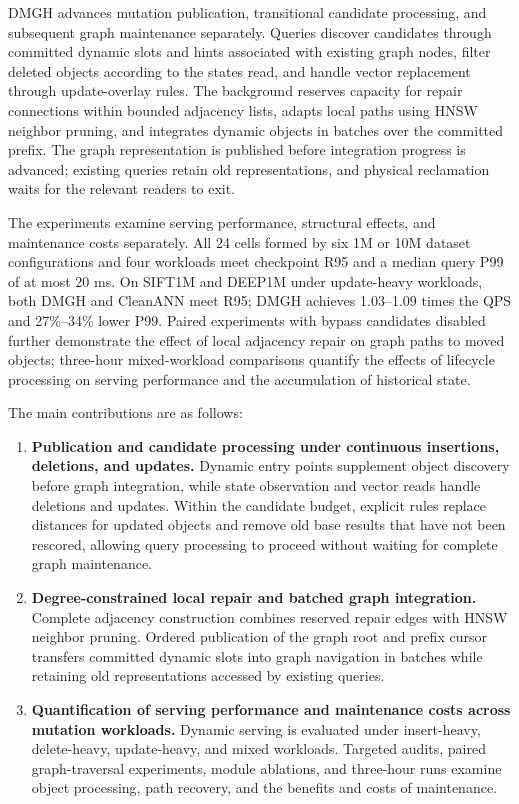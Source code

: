 \documentclass[sigconf,pbalance]{acmart}
\begin{document}
DMGH advances mutation publication, transitional candidate processing, and subsequent graph maintenance separately. Queries discover candidates through committed dynamic slots and hints associated with existing graph nodes, filter deleted objects according to the states read, and handle vector replacement through update-overlay rules. The background reserves capacity for repair connections within bounded adjacency lists, adapts local paths using HNSW neighbor pruning, and integrates dynamic objects in batches over the committed prefix. The graph representation is published before integration progress is advanced; existing queries retain old representations, and physical reclamation waits for the relevant readers to exit.

The experiments examine serving performance, structural effects, and maintenance costs separately. All 24 cells formed by six 1M or 10M dataset configurations and four workloads meet checkpoint R95 and a median query P99 of at most 20 ms. On SIFT1M and DEEP1M under update-heavy workloads, both DMGH and CleanANN meet R95; DMGH achieves 1.03--1.09 times the QPS and 27\%--34\% lower P99. Paired experiments with bypass candidates disabled further demonstrate the effect of local adjacency repair on graph paths to moved objects; three-hour mixed-workload comparisons quantify the effects of lifecycle processing on serving performance and the accumulation of historical state.

The main contributions are as follows:
\begin{enumerate}
\item \textbf{Publication and candidate processing under continuous insertions, deletions, and updates.} Dynamic entry points supplement object discovery before graph integration, while state observation and vector reads handle deletions and updates. Within the candidate budget, explicit rules replace distances for updated objects and remove old base results that have not been rescored, allowing query processing to proceed without waiting for complete graph maintenance.
\item \textbf{Degree-constrained local repair and batched graph integration.} Complete adjacency construction combines reserved repair edges with HNSW neighbor pruning. Ordered publication of the graph root and prefix cursor transfers committed dynamic slots into graph navigation in batches while retaining old representations accessed by existing queries.
\item \textbf{Quantification of serving performance and maintenance costs across mutation workloads.} Dynamic serving is evaluated under insert-heavy, delete-heavy, update-heavy, and mixed workloads. Targeted audits, paired graph-traversal experiments, module ablations, and three-hour runs examine object processing, path recovery, and the benefits and costs of maintenance.
\end{enumerate}
\end{document}
